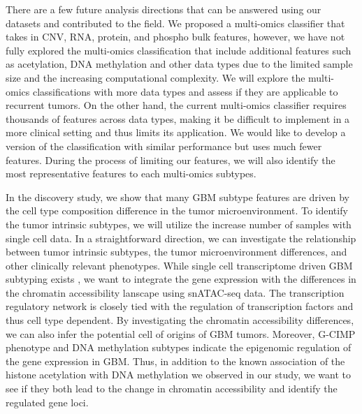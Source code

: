 There are a few future analysis directions that can be answered using our datasets and contributed to the field. We proposed a multi-omics classifier that takes in CNV, RNA, protein, and phospho bulk features, however, we have not fully explored the multi-omics classification that include additional features such as acetylation, DNA methylation and other data types due to the limited sample size and the increasing computational complexity. We will explore the multi-omics classifications with more data types and assess if they are applicable to recurrent tumors. On the other hand, the current multi-omics classifier requires thousands of features across data types, making it be difficult to implement in a more clinical setting and thus limits its application. We would like to develop a version of the classification with similar performance but uses much fewer features. During the process of limiting our features, we will also identify the most representative features to each multi-omics subtypes.

In the discovery study, we show that many GBM subtype features are driven by the cell type composition difference in the tumor microenvironment. To identify the tumor intrinsic subtypes, we will utilize the increase number of samples with single cell data. In a straightforward direction, we can investigate the relationship between tumor intrinsic subtypes, the tumor microenvironment differences, and other clinically relevant phenotypes. While single cell transcriptome driven GBM subtyping exists \cite{suvaml_tiroshi:GliomaStem2020,pinear_fineha:TumorMicroenvironment2020}, we want to integrate the gene expression with the differences in the chromatin accessibility lanscape using snATAC-seq data. The transcription regulatory network is closely tied with the regulation of transcription factors and thus cell type dependent. By investigating the chromatin accessibility differences, we can also infer the potential cell of origins of GBM tumors. Moreover, G-CIMP phenotype and DNA methylation subtypes indicate the epigenomic regulation of the gene expression in GBM. Thus, in addition to the known association of the histone acetylation with DNA methylation we observed in our study, we want to see if they both lead to the change in chromatin accessibility and identify the regulated gene loci.

